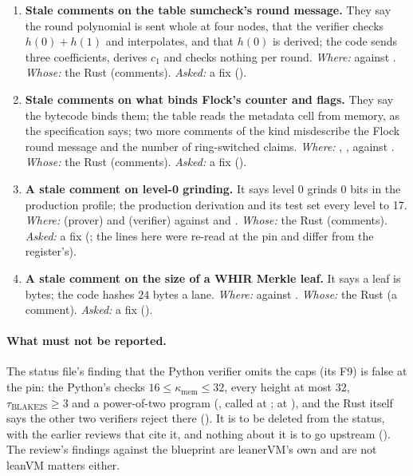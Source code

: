 \begin{sloppypar}
\begin{enumerate}[leftmargin=*, itemsep=5pt]
\item \textbf{Stale comments on the table sumcheck's round message.} They say the round
  polynomial is sent whole at four nodes, that the verifier checks $h(0) + h(1)$ and interpolates,
  and that $h(0)$ is derived; the code sends three coefficients, derives $c_1$ and checks nothing
  per round. \emph{Where:}  against
  . \emph{Whose:} the Rust (comments). \emph{Asked:}
  a fix ().

\item \textbf{Stale comments on what binds Flock's counter and flags.} They say the bytecode
  binds them; the table reads the metadata cell from memory, as the specification says; two more
  comments of the kind misdescribe the Flock round message and the number of ring-switched
  claims. \emph{Where:} ,
  ,  against
  . \emph{Whose:} the Rust (comments). \emph{Asked:} a fix
  ().

\item \textbf{A stale comment on level-0 grinding.} It says level 0 grinds 0 bits in the
  production profile; the production derivation and its test set every level to 17. \emph{Where:}
   (prover) and  (verifier) against
   and . \emph{Whose:} the
  Rust (comments). \emph{Asked:} a fix (; the lines here were re-read at the pin and
  differ from the register's).

\item \textbf{A stale comment on the size of a WHIR Merkle leaf.} It says a leaf is
   bytes; the code hashes $24$ bytes a lane. \emph{Where:}
   against . \emph{Whose:} the Rust (a comment).
  \emph{Asked:} a fix ().
\end{enumerate}
\end{sloppypar}

\paragraph{What must not be reported.} The status file's finding that the Python verifier omits
the caps (its F9) is false at the pin: the Python's  checks
$16 ≤ κ_{\mathrm{mem}} ≤ 32$, every height at most 32, $τ_{\mathrm{BLAKE2S}} ≥ 3$ and a
power-of-two program (, called at ;  at
), and the Rust itself says the other two verifiers reject there
(). It is to be deleted from the status, with the earlier
reviews that cite it, and nothing about it is to go upstream (). The review's findings
against the blueprint are leanerVM's own and are not leanVM matters either.
